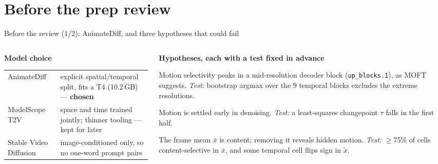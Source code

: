 \documentclass[aspectratio=169,11pt]{beamer}
\newcommand{\xs}{\bar{x}}
\newcommand{\xd}{\tilde{x}}
\newcommand{\code}[1]{\texttt{#1}}
\begin{document}
\section{Before the prep review}
\begin{frame}{Before the review (1/2): AnimateDiff, and three hypotheses that could fail}
  \begin{columns}[T,onlytextwidth]
    \begin{column}{0.4\textwidth}
      \small
      \textbf{Model choice}\\[1mm]
      \begin{tabular}{@{}>{\raggedright}p{1.9cm}>{\raggedright\arraybackslash}p{3.9cm}@{}}
        \toprule
        AnimateDiff & explicit spatial/temporal split, fits a T4 (10.2\,GB) --- \textbf{chosen} \\
        \addlinespace ModelScope T2V & space and time trained jointly; thinner tooling --- kept for later \\
        \addlinespace Stable Video Diffusion & image-conditioned only, so no one-word prompt pairs \\
        \bottomrule
      \end{tabular}
    \end{column}
    \begin{column}{0.56\textwidth}
      \small
      \textbf{Hypotheses, each with a test fixed in advance}
      \begin{description}[H3]
        \item[H1] Motion selectivity peaks in a mid-resolution decoder block (\code{up\_blocks.1}),
          as MOFT \cite{xiao2024moft} suggests. \emph{Test:} bootstrap argmax over the 9 temporal
          blocks excludes the extreme resolutions.
        \item[H2] Motion is settled early in denoising. \emph{Test:} a least-squares changepoint
          $\tau$ falls in the first half.
        \item[H3] The frame mean $\xs$ is content; removing it reveals hidden motion. \emph{Test:}
          $\ge$75\% of cells content-selective in $\xs$, and some temporal cell flips sign in $\xd$.
      \end{description}
    \end{column}
  \end{columns}
\end{frame}
\end{document}
